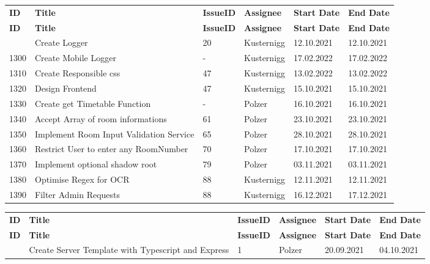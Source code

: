 \pagebreak
{}
\begin{longtable}{|p{}|p{}|p{}|p{}|p{}|p{}|} \hline
    \textbf{ID} & \textbf{Title} & \textbf{Issue\-ID} & \textbf{Assignee} & \textbf{Start Date} & \textbf{End \linebreak Date} \\ \hhline{|=|=|=|=|=|=|}
    \endfirsthead
    \hline
    \textbf{ID} & \textbf{Title} & \textbf{Issue\-ID} & \textbf{Assignee} & \textbf{Start Date} & \textbf{End \linebreak Date} \\ \hhline{|=|=|=|=|=|=|}
    \endhead
    1280 & Create Logger & 20 & Kusternigg & 12.10.2021 & 12.10.2021 \\ \hline
    1300 & Create Mobile Logger & - & Kusternigg & 17.02.2022 & 17.02.2022 \\ \hline
    1310 & Create Responsible css & 47 & Kusternigg & 13.02.2022 & 13.02.2022 \\ \hline
    1320 & Design Frontend & 47 & Kusternigg & 15.10.2021 & 15.10.2021 \\ \hline
    1330 & Create get Timetable Function & - & Polzer & 16.10.2021 & 16.10.2021 \\ \hline
    1340 & Accept Array of room informations & 61 & Polzer & 23.10.2021 & 23.10.2021 \\ \hline
    1350 & Implement Room Input Validation Service & 65 & Polzer & 28.10.2021 & 28.10.2021 \\ \hline
    1360 & Restrict User to enter any RoomNumber & 70 & Polzer & 17.10.2021 & 17.10.2021 \\ \hline
    1370 & Implement optional shadow root & 79  & Polzer & 03.11.2021 & 03.11.2021 \\ \hline
    1380 & Optimise Regex for OCR & 88  & Kusternigg & 12.11.2021 & 12.11.2021 \\ \hline
    1390 & Filter Admin Requests & 88  & Kusternigg & 16.12.2021 & 17.12.2021 \\ \hline
\end{longtable}


\begin{longtable}{|p{}|p{}|p{}|p{}|p{}|p{}|} \hline
    \textbf{ID} & \textbf{Title} & \textbf{Issue\-ID} & \textbf{Assignee} & \textbf{Start Date} & \textbf{End \linebreak Date} \\ \hhline{|=|=|=|=|=|=|}
    \endfirsthead
    \hline
    \textbf{ID} & \textbf{Title} & \textbf{Issue\-ID} & \textbf{Assignee} & \textbf{Start Date} & \textbf{End \linebreak Date} \\ \hhline{|=|=|=|=|=|=|}
    \endhead
    2000 & Create Server Template with Typescript and Express & 1 & Polzer & 20.09.2021 & 04.10.2021 \\ \hline
\end{longtable}

